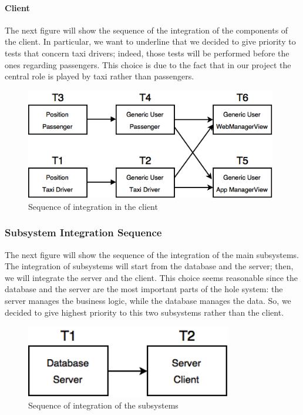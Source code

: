 \paragraph{Client}\mbox{}
\newline
The next figure will show the sequence of the integration of the components of the client.
\newline
In particular, we want to underline that we decided to give priority to tests that concern taxi drivers; indeed, those tests will be performed before the ones regarding passengers. This choice is due to the fact that in our project the central role is played by taxi rather than passengers. 
\newline
\begin{figure}[H]
    \centering
    \includegraphics[width=11cm]{./Images/Client.png}
    \caption{Sequence of integration in the client}
    \label{fig: Sequence of integration in the client}
\end{figure}

\newpage

\subsubsection{Subsystem Integration Sequence}
The next figure will show the sequence of the integration of the main subsystems.
\newline
The integration of subsystems will start from the database and the server; then, we will integrate the server and the client. This choice seems reasonable since the database and the server are the most important parts of the hole system: the server manages the business logic, while the database manages the data. So, we decided to give highest priority to this two subsystems rather than the client.
\newline
\begin{figure}[H]
    \centering
    \includegraphics[width=9cm]{./Images/Subsystem.png}
    \caption{Sequence of integration of the subsystems}
    \label{fig: Sequence of integration of the subsystems}
\end{figure}